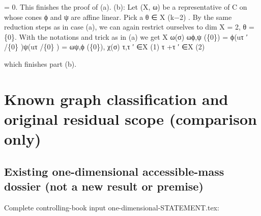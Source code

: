 \documentclass[
  11pt,
]{article}
\newenvironment{Shaded}{}{}
\newcommand{\NormalTok}[1]{#1}
\begin{document}
\begin{Shaded}
\begin{Highlighting}[]
\NormalTok{                        = 0.}
\NormalTok{This finishes the proof of (a).}
\NormalTok{(b): Let (X, ω) be a representative of C on whose cones ϕ and ψ are affine linear. Pick a}
\NormalTok{θ ∈ X (k−2) . By the same reduction steps as in case (a), we can again restrict ourselves to}
\NormalTok{dim X = 2, θ = \{0\}. With the notations and trick as in (a) we get}
\NormalTok{                                 X          ω(σ)}
\NormalTok{            ωϕ,ψ (\{0\}) =                         ϕ(uτ ′ /\{0\} )ψ(uτ /\{0\} ) = ωψ,ϕ (\{0\}),}
\NormalTok{                                            χ(σ)}
\NormalTok{                             τ,τ ′ ∈X (1)}
\NormalTok{                            τ +τ ′ ∈X (2)}

\NormalTok{which finishes part (b).                                                                                 }
\end{Highlighting}
\end{Shaded}

\section{Known graph classification and original residual scope
(comparison
only)}\label{known-graph-classification-and-original-residual-scope-comparison-only}

\subsection{Existing one-dimensional accessible-mass dossier (not a new
result or
premise)}\label{existing-one-dimensional-accessible-mass-dossier-not-a-new-result-or-premise}

Complete controlling-book input one-dimensional-STATEMENT.tex:
\end{document}
